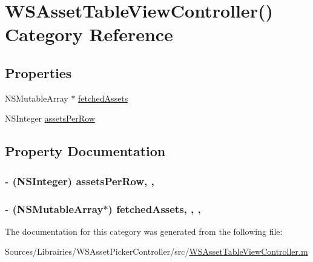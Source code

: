 \hypertarget{category_w_s_asset_table_view_controller_07_08}{\section{W\-S\-Asset\-Table\-View\-Controller() Category Reference}
\label{category_w_s_asset_table_view_controller_07_08}
}
\subsection*{Properties}
\begin{DoxyCompactItemize}
\item 
N\-S\-Mutable\-Array $\ast$ \hyperlink{category_w_s_asset_table_view_controller_07_08_aa8b62befffc1c60b7da461dae5298f08}{fetched\-Assets}
\item 
N\-S\-Integer \hyperlink{category_w_s_asset_table_view_controller_07_08_aaa23bcc5611b06bc7997987d5144a212}{assets\-Per\-Row}
\end{DoxyCompactItemize}


\subsection{Property Documentation}
\hypertarget{category_w_s_asset_table_view_controller_07_08_aaa23bcc5611b06bc7997987d5144a212}{
\subsubsection[{assets\-Per\-Row}]{\setlength{\rightskip}{0pt plus 5cm}-\/ (N\-S\-Integer) assets\-Per\-Row\hspace{0.3cm}{\ttfamily [read]}, {\ttfamily [nonatomic]}, {\ttfamily [assign]}}}\label{category_w_s_asset_table_view_controller_07_08_aaa23bcc5611b06bc7997987d5144a212}
\hypertarget{category_w_s_asset_table_view_controller_07_08_aa8b62befffc1c60b7da461dae5298f08}{
\subsubsection[{fetched\-Assets}]{\setlength{\rightskip}{0pt plus 5cm}-\/ (N\-S\-Mutable\-Array$\ast$) fetched\-Assets\hspace{0.3cm}{\ttfamily [read]}, {\ttfamily [write]}, {\ttfamily [nonatomic]}, {\ttfamily [strong]}}}\label{category_w_s_asset_table_view_controller_07_08_aa8b62befffc1c60b7da461dae5298f08}


The documentation for this category was generated from the following file\-:\begin{DoxyCompactItemize}
\item 
Sources/\-Librairies/\-W\-S\-Asset\-Picker\-Controller/src/\hyperlink{_w_s_asset_table_view_controller_8m}{W\-S\-Asset\-Table\-View\-Controller.\-m}\end{DoxyCompactItemize}
